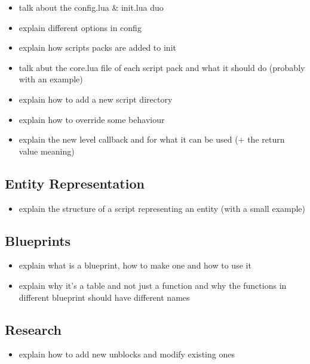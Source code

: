 \begin{itemize}
    \item talk about the config.lua \& init.lua duo
    \item explain different options in config
    \item explain how scripts packs are added to init
    \item talk abut the core.lua file of each script pack
        and what it should do (probably with an example)
    \item explain how to add a new script directory
    \item explain how to override some behaviour
    \item explain the new level callback and for what it can be used
        (+ the return value meaning)
\end{itemize}

\subsection{Entity Representation}

\begin{itemize}
    \item explain the structure of a script representing
        an entity (with a small example)
\end{itemize}

\subsection{Blueprints}

\begin{itemize}
    \item explain what is a blueprint, how to make one and
        how to use it
    \item explain why it's a table and not just a function
        and why the functions in different blueprint should
        have different names
\end{itemize}

\subsection{Research}

\begin{itemize}
    \item explain how to add new unblocks and modify existing ones
\end{itemize}

